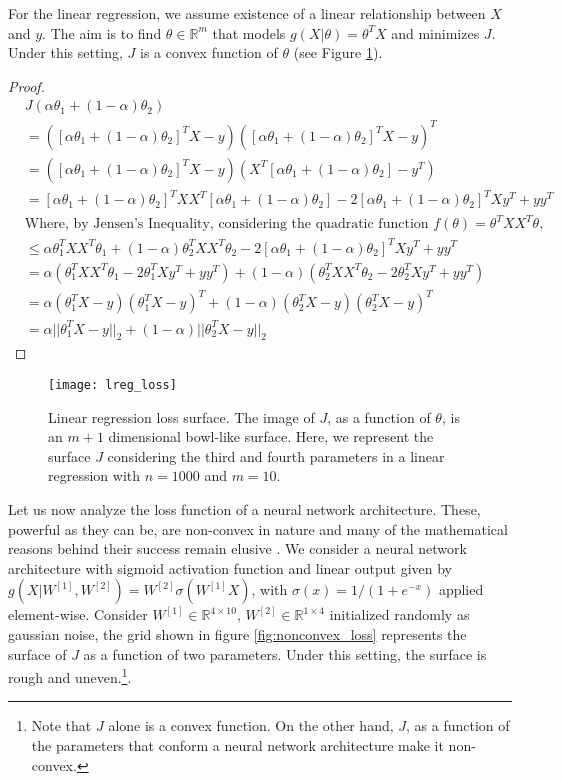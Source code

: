 \documentclass{article}
\newcommand{\rnums}{\mathbb{R}}
\begin{document}
	For the linear regression, we assume existence of a linear relationship between $X$ and $y$. The aim is to find $\theta\in\rnums^{m}$ that models $g(X|\theta) = \theta^T X$ and minimizes $J$. Under this setting, $J$ is a convex function of $\theta$ (see Figure \ref{fig:convex_loss}).
	
	\begin{proof}
	\begin{align*}
		&J(\alpha \theta_1 + (1 - \alpha)\theta_2) \\
		&= ([\alpha \theta_1 + (1 - \alpha)\theta_2]^TX -y)([\alpha \theta_1 + (1 - \alpha)\theta_2]^TX -y)^T\\
		&= ([\alpha \theta_1 + (1 - \alpha)\theta_2]^TX -y)(X^T[\alpha \theta_1 + (1 - \alpha)\theta_2] -y^T)\\
		&= [\alpha\theta_1 + (1-\alpha)\theta_2]^TXX^T[\alpha\theta_1 + (1-\alpha)\theta_2] - 2[\alpha\theta_1 + (1-\alpha)\theta_2]^TXy^T + yy^T\\
		&\text{Where, by Jensen's Inequality, considering the quadratic function $f(\theta) = \theta^TXX^T\theta$,}\\
		&\leq \alpha \theta_1^TXX^T\theta_1 + (1 - \alpha) \theta_2^TXX^T\theta_2 - 2[\alpha\theta_1 + (1-\alpha)\theta_2]^TXy^T + yy^T\\
		&= \alpha(\theta_1^TXX^T\theta_1 - 2\theta_1^TXy^T + yy^T) + (1 - \alpha)(\theta_2^TXX^T\theta_2 - 2\theta_2^TXy^T + yy^T) \\
		&= \alpha(\theta_1^TX - y)(\theta_1^TX - y)^T + (1 - \alpha)(\theta_2^TX - y)(\theta_2^TX - y)^T\\
		&= \alpha ||\theta_1^TX - y||_2 + (1 - \alpha) ||\theta_2^TX - y||_2
	\end{align*}
	\end{proof}
	
	\begin{figure}[h!]
		\centering
		\texttt{[image: lreg\_loss]}
		\caption{Linear regression loss surface. The image of $J$, as a function of $\theta$, is an $m + 1$ dimensional bowl-like surface. Here, we represent the surface $J$ considering the third and fourth parameters in a linear regression with $n=1000$ and $m=10$.}
		\label{fig:convex_loss}
	\end{figure}
	
	Let us now analyze the loss function of a neural network architecture. These, powerful as they can be, are non-convex in nature and many of the mathematical reasons behind their success remain elusive \cite{vidal-et-al}. We consider a neural network architecture with sigmoid activation function and linear output given by $g(X|W^{[1]}, W^{[2]}) = W^{[2]}\sigma\left(W^{[1]} X\right)$, with $\sigma(x) = 1 / (1 + e^{-x})$ applied element-wise. Consider $W^{[1]} \in \rnums^{4\times 10}$, $W^{[2]} \in \rnums^{1\times 4}$ initialized randomly as gaussian noise, the grid shown in figure \ref{fig:nonconvex_loss} represents the surface of $J$ as a function of two parameters. Under this setting, the surface is rough and uneven.\footnote{Note that $J$ alone is a convex function. On the other hand, $J$, as a function of the parameters that conform a neural network architecture make it non-convex.}.\\
		
\end{document}
